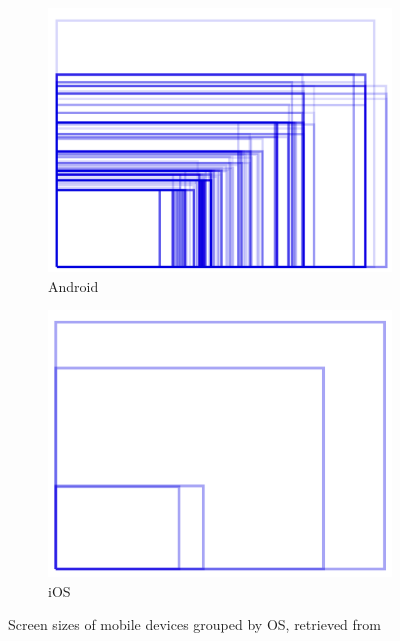 \begin{figure}[h]
	\centering
	\begin{subfigure}{.49\textwidth}
  		\centering
  		\includegraphics[width=0.98\linewidth]{./images/android-screen.png}
  		\caption{Android}
  		\label{fig:AndroidScreenFragmentation}
	\end{subfigure}
	\begin{subfigure}{.49\textwidth}
  		\centering
  		\includegraphics[width=0.98\linewidth]{./images/ios-screen.png}
  		\caption{iOS}
  		\label{fig:iOSScreenFragmentation}
	\end{subfigure}
	\caption{Screen sizes of mobile devices grouped by \gls{OS}, retrieved from \cite{OpenSignal:2014aa}}
	\label{fig:MobileScreenFragmentation}
\end{figure}
\nocite{OpenSignal:2014aa}


